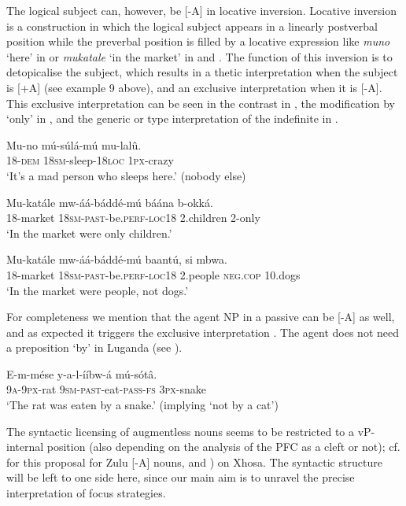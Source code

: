 \documentclass[output=paper]{langsci/langscibook}
\begin{document}
The logical subject can, however, be [-A] in locative inversion. Locative inversion is a construction in which the logical subject appears in a linearly postverbal position while the preverbal position is filled by a locative expression like \textit{muno} ‘here’ in  or \textit{mukatale} ‘in the market’ in  and . The function of this inversion is to detopicalise the subject, which results in a thetic interpretation when the subject is [+A] (see example 9 above), and an exclusive interpretation when it is [-A]. This exclusive interpretation can be seen in the contrast in , the modification by ‘only’ in , and the generic or type interpretation of the indefinite in .

\ea
\gll   Mu-no    mú-súlá-mú    mu-lalû.\\
       18-\textsc{dem}  \textsc{18sm}-sleep-\textsc{18loc}  \textsc{1px}-crazy\\
\glt   ‘It’s a mad person who sleeps here.’ (nobody else)
\z

\ea
\gll   Mu-katále  mw-áá-báddé-mú      báána    b-okká.\\
       18-market  \textsc{18sm}-\textsc{past}-be.\textsc{perf}-\textsc{loc18}  2.children  2-only\\
\glt   ‘In the market were only children.’
\z

\ea
\gll   Mu-katále  mw-áá-báddé-mú    baantú,    si    mbwa.\\
       18-market  \textsc{18sm}-\textsc{past}-be.\textsc{perf}-\textsc{loc18}  2.people  \textsc{neg}.\textsc{cop}  10.dogs\\
\glt   ‘In the market were people, not dogs.’
\z

For completeness we mention that the agent NP in a passive can be [-A] as well, and as expected it triggers the exclusive interpretation . The agent does not need a preposition ‘by’ in Luganda (see \citealt{Pak2008}).

\ea
\gll   E-m-mése  y-a-l-ííbw-á      mú-sótâ.\\
       \textsc{9a}-\textsc{9px}-rat  \textsc{9sm}-\textsc{past}-eat-\textsc{pass}-\textsc{fs}  \textsc{3px}-snake\\
\glt   ‘The rat was eaten by a snake.’ (implying ‘not by a cat’)
\z

The syntactic licensing of augmentless nouns seems to be restricted to a vP-internal position (also depending on the analysis of the PFC as a cleft or not); cf. \citet{Halpert2012,Halpert2013} for this proposal for Zulu [-A] nouns, and \citealt{CarstensMletshe2013,CarstensMletshe2015}) on Xhosa. The syntactic structure will be left to one side here, since our main aim is to unravel the precise interpretation of focus strategies.
\end{document}
